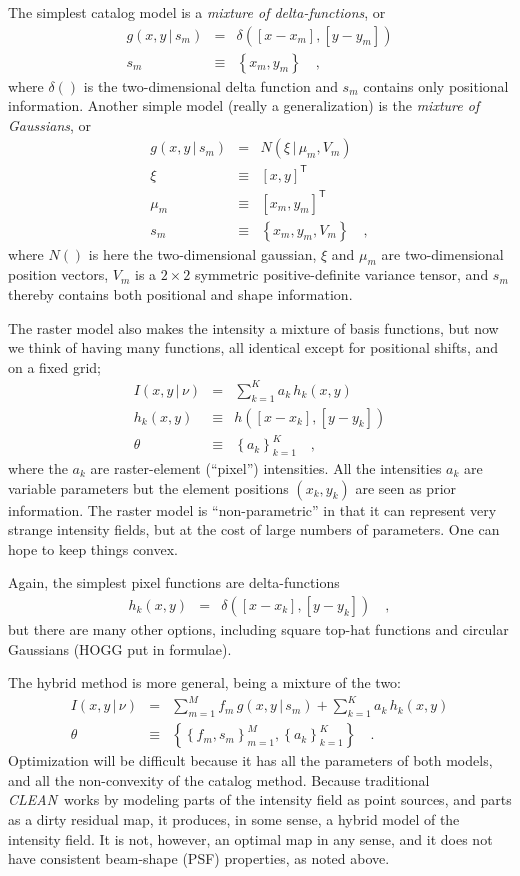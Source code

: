 \documentclass[12pt]{article}
\newcommand{\project}[1]{\textsl{#1}}
\newcommand{\CLEAN}{\project{CLEAN}}
\newcommand{\set}[1]{\left\{{#1}\right\}}
\newcommand{\given}{\,|\,}
\newcommand{\normal}{N}
\newcommand{\transpose}[1]{{#1}^{\!\mathsf{T}}}
\begin{document}
The simplest catalog model is a \emph{mixture of delta-functions}, or
\begin{eqnarray}
g(x,y\given s_m) &=& \delta([x-x_m], [y-y_m])
\\
s_m &\equiv& \set{x_m, y_m}
\quad,
\end{eqnarray}
where $\delta()$ is the two-dimensional delta function and $s_m$
contains only positional information.  Another simple model (really a
generalization) is the \emph{mixture of Gaussians}, or
\begin{eqnarray}
g(x,y\given s_m) &=& \normal(\xi\given\mu_m,V_m)
\\
\xi &\equiv& \transpose{[x, y]}
\\
\mu_m &\equiv& \transpose{[x_m, y_m]}
\\
s_m &\equiv& \set{x_m, y_m, V_m}
\quad,
\end{eqnarray}
where $\normal()$ is here the two-dimensional gaussian, $\xi$ and
$\mu_m$ are two-dimensional position vectors, $V_m$ is a $2\times 2$
symmetric positive-definite variance tensor, and $s_m$ thereby
contains both positional and shape information.

The raster model also makes the intensity a mixture of basis
functions, but now we think of having many functions, all identical
except for positional shifts, and on a fixed grid;
\begin{eqnarray}
I(x,y\given\nu) &=& \sum_{k=1}^K a_k\,h_k(x, y)
\\
h_k(x, y) &\equiv& h([x-x_k], [y-y_k])
\\
\theta &\equiv& \set{a_k}_{k=1}^K
\quad,
\end{eqnarray}
where the $a_k$ are raster-element (``pixel'') intensities.  All the
intensities $a_k$ are variable parameters but the element positions
$(x_k, y_k)$ are seen as prior information.  The raster model is
``non-parametric'' in that it can represent very strange intensity
fields, but at the cost of large numbers of parameters.  One can hope
to keep things convex.

Again, the simplest pixel functions are delta-functions
\begin{eqnarray}
h_k(x,y) &=& \delta([x-x_k], [y-y_k])
\quad,
\end{eqnarray}
but there are many other options, including square top-hat functions
and circular Gaussians (HOGG put in formulae).

The hybrid method is more general, being a mixture of the two:
\begin{eqnarray}
I(x,y\given\nu) &=& \sum_{m=1}^M f_m\,g(x,y\given s_m)
                  + \sum_{k=1}^K a_k\,h_k(x, y)
\\
\theta &\equiv& \set{\set{f_m, s_m}_{m=1}^M, \set{a_k}_{k=1}^K}
\quad.
\end{eqnarray}
Optimization will be difficult because it has all the parameters of
both models, and all the non-convexity of the catalog method.  Because
traditional \CLEAN\ works by modeling parts of the intensity field as
point sources, and parts as a dirty residual map, it produces, in some
sense, a hybrid model of the intensity field.  It is not, however, an
optimal map in any sense, and it does not have consistent beam-shape
(PSF) properties, as noted above.
\end{document}
